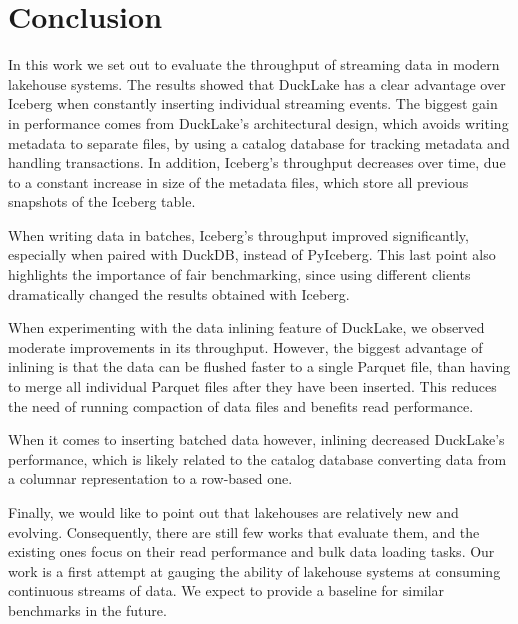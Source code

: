 \chapter{Conclusion}\label{ch:conclusion}

In this work we set out to evaluate the throughput of streaming data in modern lakehouse systems. The results showed that DuckLake has a clear advantage over Iceberg when constantly inserting individual streaming events. The biggest gain in performance comes from DuckLake's architectural design, which avoids writing metadata to separate files, by using a catalog database for tracking metadata and handling transactions. In addition, Iceberg's throughput decreases over time, due to a constant increase in size of the metadata files, which store all previous snapshots of the Iceberg table. 

When writing data in batches, Iceberg's throughput improved significantly, especially when paired with DuckDB, instead of PyIceberg. This last point also highlights the importance of fair benchmarking, since using different clients dramatically changed the results obtained with Iceberg.

When experimenting with the data inlining feature of DuckLake, we observed moderate improvements in its throughput. However, the biggest advantage of inlining is that the data can be flushed faster to a single Parquet file, than having to merge all individual Parquet files after they have been inserted. This reduces the need of running compaction of data files and benefits read performance. 

When it comes to inserting batched data however, inlining decreased DuckLake's performance, which is likely related to the catalog database converting data from a columnar representation to a row-based one.

Finally, we would like to point out that lakehouses are relatively new and evolving. Consequently, there are still few works that evaluate them, and the existing ones focus on their read performance and bulk data loading tasks. Our work is a first attempt at gauging the ability of lakehouse systems at consuming continuous streams of data. We expect to provide a baseline for similar benchmarks in the future.